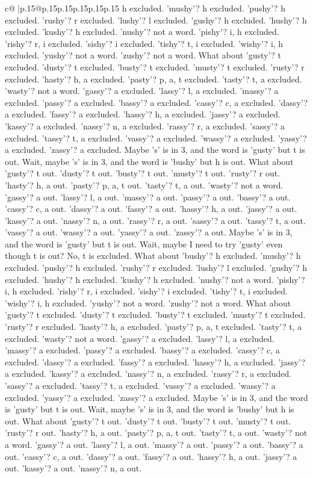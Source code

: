 \documentclass{article}
\begin{document}
{\begin{supertabular}{c@{$\;$}|p{.15\linewidth}@{}p{.15\linewidth}p{.15\linewidth}p{.15\linewidth}p{.15\linewidth}p{.15\linewidth}}
{{{h excluded. 'mushy'? h excluded. 'pushy'? h excluded. 'rushy'? r excluded. 'lushy'? l excluded. 'gushy'? h excluded. 'hushy'? h excluded. 'kushy'? h excluded. 'nushy'? not a word. 'pishy'? i, h excluded. 'rishy'? r, i excluded. 'sishy'? i excluded. 'tishy'? t, i excluded. 'wishy'? i, h excluded. 'yushy'? not a word. 'zushy'? not a word. What about 'gusty'? t excluded. 'dusty'? t excluded. 'busty'? t excluded. 'musty'? t excluded. 'rusty'? r excluded. 'hasty'? h, a excluded. 'pasty'? p, a, t excluded. 'tasty'? t, a excluded. 'wasty'? not a word. 'gassy'? a excluded. 'lassy'? l, a excluded. 'massy'? a excluded. 'passy'? a excluded. 'bassy'? a excluded. 'cassy'? c, a excluded. 'dassy'? a excluded. 'fassy'? a excluded. 'hassy'? h, a excluded. 'jassy'? a excluded. 'kassy'? a excluded. 'nassy'? n, a excluded. 'rassy'? r, a excluded. 'sassy'? a excluded. 'tassy'? t, a excluded. 'vassy'? a excluded. 'wassy'? a excluded. 'yassy'? a excluded. 'zassy'? a excluded. Maybe 's' is in 3, and the word is 'gusty' but t is out. Wait, maybe 's' is in 3, and the word is 'bushy' but h is out. What about 'gusty'? t out. 'dusty'? t out. 'busty'? t out. 'musty'? t out. 'rusty'? r out. 'hasty'? h, a out. 'pasty'? p, a, t out. 'tasty'? t, a out. 'wasty'? not a word. 'gassy'? a out. 'lassy'? l, a out. 'massy'? a out. 'passy'? a out. 'bassy'? a out. 'cassy'? c, a out. 'dassy'? a out. 'fassy'? a out. 'hassy'? h, a out. 'jassy'? a out. 'kassy'? a out. 'nassy'? n, a out. 'rassy'? r, a out. 'sassy'? a out. 'tassy'? t, a out. 'vassy'? a out. 'wassy'? a out. 'yassy'? a out. 'zassy'? a out. Maybe 's' is in 3, and the word is 'gusty' but t is out. Wait, maybe I need to try 'gusty' even though t is out? No, t is excluded. What about 'bushy'? h excluded. 'mushy'? h excluded. 'pushy'? h excluded. 'rushy'? r excluded. 'lushy'? l excluded. 'gushy'? h excluded. 'hushy'? h excluded. 'kushy'? h excluded. 'nushy'? not a word. 'pishy'? i, h excluded. 'rishy'? r, i excluded. 'sishy'? i excluded. 'tishy'? t, i excluded. 'wishy'? i, h excluded. 'yushy'? not a word. 'zushy'? not a word. What about 'gusty'? t excluded. 'dusty'? t excluded. 'busty'? t excluded. 'musty'? t excluded. 'rusty'? r excluded. 'hasty'? h, a excluded. 'pasty'? p, a, t excluded. 'tasty'? t, a excluded. 'wasty'? not a word. 'gassy'? a excluded. 'lassy'? l, a excluded. 'massy'? a excluded. 'passy'? a excluded. 'bassy'? a excluded. 'cassy'? c, a excluded. 'dassy'? a excluded. 'fassy'? a excluded. 'hassy'? h, a excluded. 'jassy'? a excluded. 'kassy'? a excluded. 'nassy'? n, a excluded. 'rassy'? r, a excluded. 'sassy'? a excluded. 'tassy'? t, a excluded. 'vassy'? a excluded. 'wassy'? a excluded. 'yassy'? a excluded. 'zassy'? a excluded. Maybe 's' is in 3, and the word is 'gusty' but t is out. Wait, maybe 's' is in 3, and the word is 'bushy' but h is out. What about 'gusty'? t out. 'dusty'? t out. 'busty'? t out. 'musty'? t out. 'rusty'? r out. 'hasty'? h, a out. 'pasty'? p, a, t out. 'tasty'? t, a out. 'wasty'? not a word. 'gassy'? a out. 'lassy'? l, a out. 'massy'? a out. 'passy'? a out. 'bassy'? a out. 'cassy'? c, a out. 'dassy'? a out. 'fassy'? a out. 'hassy'? h, a out. 'jassy'? a out. 'kassy'? a out. 'nassy'? n, a out. }}}
\end{supertabular}}
\end{document}
